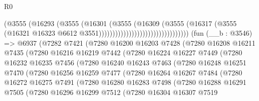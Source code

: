 \begin{lexlean}{R0}
\begin{coremodule}
                                                  (@3555
                                                    (@16293
                                                      (@3555
                                                        (@16301
                                                          (@3555
                                                            (@16309
                                                              (@3555
                                                                (@16317
                                                                  (@3555
                                                                    (@16321
                                                                      @16323
                                                                      @6612
                                                                      @3551)))))))))))))))))))))))))))))))))
    (fun (__b : @3546) =>
    @6937
      (@7282
        @7421
        (@7280
          @16200
          @16203
          @7428
          (@7280
            @16208
            @16211
            @7435
            (@7280
              @16216
              @16219
              @7442
              (@7280
                @16224
                @16227
                @7449
                (@7280
                  @16232
                  @16235
                  @7456
                  (@7280
                    @16240
                    @16243
                    @7463
                    (@7280
                      @16248
                      @16251
                      @7470
                      (@7280
                        @16256
                        @16259
                        @7477
                        (@7280
                          @16264
                          @16267
                          @7484
                          (@7280
                            @16272
                            @16275
                            @7491
                            (@7280
                              @16280
                              @16283
                              @7498
                              (@7280
                                @16288
                                @16291
                                @7505
                                (@7280
                                  @16296
                                  @16299
                                  @7512
                                  (@7280
                                    @16304
                                    @16307
                                    @7519

\end{coremodule}
\end{lexlean}
